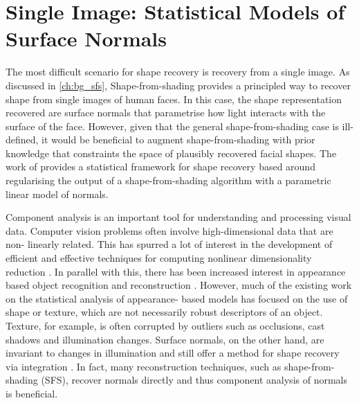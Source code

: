 \chapter{Single Image: Statistical Models of Surface Normals}\label{ch:singl_imag}
\minitoc{}
The most difficult scenario for shape recovery is recovery from a single
image. As discussed in \cref{ch:bg_sfs}, Shape-from-shading provides a
principled way to recover shape from single images of human faces. In this case,
the shape representation recovered are surface normals that parametrise how
light interacts with the surface of the face. However, given that the general
shape-from-shading case is ill-defined, it would be beneficial to augment 
shape-from-shading with prior knowledge that constraints the space of plausibly
recovered facial shapes. The work of \citet{smith2006recovering,smith2008facial}
provides a statistical framework for shape recovery based around regularising
the output of a shape-from-shading algorithm with a parametric linear
model of normals.

Component analysis is an important tool for understanding and processing visual
data. Computer vision problems often involve high-dimensional data that are non-
linearly related. This has spurred a lot of interest in the development of
efficient and effective techniques for computing nonlinear dimensionality
reduction \cite{RefWorks:92,RefWorks:93,RefWorks:94}. In parallel with this,
there has been increased interest in appearance based object recognition and
reconstruction \cite{RefWorks:95,RefWorks:96,RefWorks:97,RefWorks:98}. 
However, much of the existing work on the statistical analysis of appearance-
based models has focused on the use of shape or texture, which are not
necessarily robust descriptors of an object. Texture, for example, is often
corrupted by outliers such as occlusions, cast shadows and illumination changes.
Surface normals, on the other hand, are invariant to changes in illumination and
still offer a method for shape recovery via integration \cite{RefWorks:99}. In
fact, many reconstruction techniques, such as shape-from-shading
(SFS)\cite{RefWorks:230, RefWorks:252, RefWorks:225}, recover normals directly
and thus component analysis of normals is beneficial.

